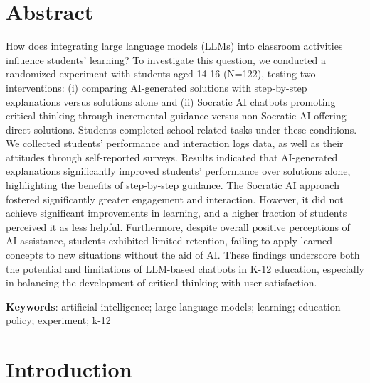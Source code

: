 \documentclass[
  11pt,
]{article}
\begin{document}
\section*{Abstract}\label{abstract}

How does integrating large language models (LLMs) into classroom activities influence students' learning? To investigate this question, we conducted a randomized experiment with students aged 14-16 (N=122), testing two interventions: (i) comparing AI-generated solutions with step-by-step explanations versus solutions alone and (ii) Socratic AI chatbots promoting critical thinking through incremental guidance versus non-Socratic AI offering direct solutions. Students completed school-related tasks under these conditions. We collected students' performance and interaction logs data, as well as their attitudes through self-reported surveys. Results indicated that AI-generated explanations significantly improved students' performance over solutions alone, highlighting the benefits of step-by-step guidance. The Socratic AI approach fostered significantly greater engagement and interaction. However, it did not achieve significant improvements in learning, and a higher fraction of students perceived it as less helpful. Furthermore, despite overall positive perceptions of AI assistance, students exhibited limited retention, failing to apply learned concepts to new situations without the aid of AI. These findings underscore both the potential and limitations of LLM-based chatbots in K-12 education, especially in balancing the development of critical thinking with user satisfaction.

\textbf{Keywords}: artificial intelligence; large language models; learning; education policy; experiment; k-12

\section{Introduction}\label{introduction}
\end{document}

